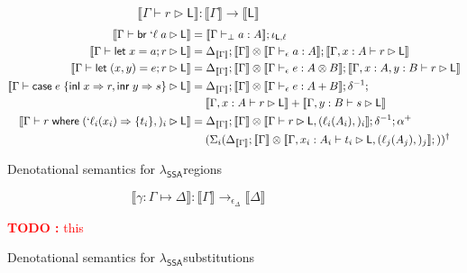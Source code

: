 \documentclass[acmsmall,screen,review]{acmart}
\newcounter{todos}
\newcommand{\TODO}[1]{{
  \stepcounter{todos}
  \begin{center}\large{\textcolor{red}{\textbf{TODO \arabic{todos}:} #1}}\end{center}
}}
\newcommand{\ms}[1]{\ensuremath{\mathsf{#1}}}
\newcommand{\lbl}[1]{{`#1}}
\newcommand{\lto}{\Rightarrow}
\newcommand{\linl}[1]{\ms{inl}\;{#1}}
\newcommand{\linr}[1]{\ms{inr}\;{#1}}
\newcommand{\letstmt}[3]{\ensuremath{\ms{let}\;#1 = #2; #3}}
\newcommand{\brb}[2]{\ms{br}\;#1\;#2}
\newcommand{\lbrb}[2]{\brb{\lbl{#1}}{#2}}
\newcommand{\casestmt}[5]{\ms{case}\;#1\;\{\linl{#2} \lto #3, \linr{#4} \lto #5\}}
\newcommand{\where}[2]{#1\;\ms{where}\;#2}
\newcommand{\wbranch}[3]{#1(#2) \lto \{#3\}}
\newcommand{\lwbranch}[3]{\wbranch{\lbl{#1}}{#2}{#3}}
\newcommand{\bhyp}[2]{#1 : #2}
\newcommand{\lhyp}[2]{#1(#2)}
\newcommand{\hasty}[4]{#1 \vdash_{#2} #3: {#4}}
\newcommand{\haslb}[3]{#1 \vdash #2 \rhd #3}
\newcommand{\issubst}[3]{#1: #2 \mapsto #3}
\newcommand{\dnt}[1]{\llbracket{#1}\rrbracket}
\newcommand{\isotopessa}{\(\lambda_{\ms{SSA}}\)}
\begin{document}
\begin{figure}[H]
  \begin{equation*}
    \boxed{\dnt{\haslb{\Gamma}{r}{\ms{L}}} : \dnt{\Gamma} \to \dnt{\ms{L}}}
  \end{equation*}
  \begin{align*}
    \dnt{\haslb{\Gamma}{\lbrb{\ell}{a}}{\ms{L}}} 
      &= \dnt{\hasty{\Gamma}{\bot}{a}{A}} ; \iota_{\ms{L}, \ell}
      \\
    \dnt{\haslb{\Gamma}{\letstmt{x}{a}{r}}{\ms{L}}}
      &= \Delta_{\dnt{\Gamma}}
      ; \dnt{\Gamma} \otimes \dnt{\hasty{\Gamma}{\epsilon}{a}{A}}
      ; \dnt{\haslb{\Gamma, \bhyp{x}{A}}{r}{\ms{L}}} 
      \\
    \dnt{\haslb{\Gamma}{\letstmt{(x, y)}{e}{r}}{\ms{L}}}
      &= \Delta_{\dnt{\Gamma}}
      ; \dnt{\Gamma} \otimes \dnt{\hasty{\Gamma}{\epsilon}{e}{A \otimes B}}
      ; \dnt{\haslb{\Gamma, \bhyp{x}{A}, \bhyp{y}{B}}{r}{\ms{L}}} 
      \\ 
    \dnt{\haslb{\Gamma}{\casestmt{e}{x}{r}{y}{s}}{\ms{L}}}
      &= \Delta_{\dnt{\Gamma}}
      ; \dnt{\Gamma} \otimes \dnt{\hasty{\Gamma}{\epsilon}{e}{A + B}}
      ; \delta^{-1} ;
      \\&\quad\;
      \dnt{\haslb{\Gamma, \bhyp{x}{A}}{r}{\ms{L}}}
      + \dnt{\haslb{\Gamma, \bhyp{y}{B}}{s}{\ms{L}}}
      \\
    \dnt{\haslb{\Gamma}{\where{r}{(\lwbranch{\ell_i}{x_i}{t_i},)_i}}{\ms{L}}}
      &=  
      \Delta_{\dnt{\Gamma}}
      ; \dnt{\Gamma} \otimes \dnt{\haslb{\Gamma}{r}{\ms{L}, (\lhyp{\ell_i}{A_i},)_i}} 
      ; \delta^{-1} ;
      \alpha^+_{}
      \\ &\quad\;
      (
        \Sigma_i (\Delta_{\dnt{\Gamma}} 
          ; \dnt{\Gamma} \otimes 
            \dnt{\haslb{\Gamma, \bhyp{x_i}{A_i}}{t_i}{\ms{L}, (\lhyp{\ell_j}{A_j},)_j}}
          ; 
          )
      )^\dagger
  \end{align*}
  \caption{Denotational semantics for \isotopessa regions}
  \label{fig:ssa-reg-sem}
\end{figure}

\begin{figure}[H]
  \begin{equation*}
    \boxed{\dnt{\issubst{\gamma}{\Gamma}{\Delta}} 
      : \dnt{\Gamma} \to_{\epsilon_\Delta} \dnt{\Delta}}
  \end{equation*}
  \TODO{this}
  \caption{Denotational semantics for \isotopessa substitutions}
  \label{fig:ssa-vsubst-sem} 
\end{figure}
\end{document}
